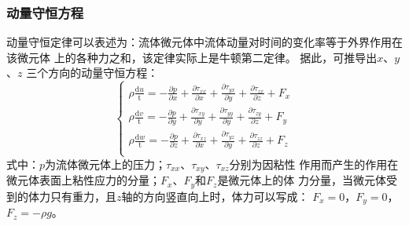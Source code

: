 \subsubsection{动量守恒方程}
动量守恒定律可以表述为：流体微元体中流体动量对时间的变化率等于外界作用在该微元体
上的各种力之和，该定律实际上是牛顿第二定律。
据此，可推导出$ x $、$ y $、$ z $ 三个方向的动量守恒方程：
\begin{equation}
  \label{eq:momentum}
  \begin{cases}
    \rho \frac{\mathrm{d} u }{\mathrm{t}} = -\frac{\partial p}{\partial x} +
    \frac{\partial \tau_{xx}}{\partial x} + \frac{\partial \tau_{yx}}{\partial y} +
    \frac{\partial \tau_{zx}}{\partial z} + F_x \\
    \rho \frac{\mathrm{d} v }{\mathrm{t}} = -\frac{\partial p}{\partial y} +
    \frac{\partial \tau_{xy}}{\partial y} + \frac{\partial \tau_{yy}}{\partial y} +
    \frac{\partial \tau_{zy}}{\partial z} + F_y \\
    \rho \frac{\mathrm{d} w }{\mathrm{t}} = -\frac{\partial p}{\partial z} +
    \frac{\partial \tau_{xz}}{\partial x} + \frac{\partial \tau_{yz}}{\partial y} +
    \frac{\partial \tau_{zz}}{\partial z} + F_z \\
  \end{cases}
\end{equation}
式中：$p$为流体微元体上的压力；$\tau_{xx}$、$\tau_{xy}$、$\tau_{xz}$分别为因粘性
作用而产生的作用在微元体表面上粘性应力的分量；$F_x$、$F_y$和$F_z$是微元体上的体
力分量，当微元体受到的体力只有重力，且$z$轴的方向竖直向上时，体力可以写成：
$F_x=0$，$F_y=0$，$F_z=-\rho g$。

